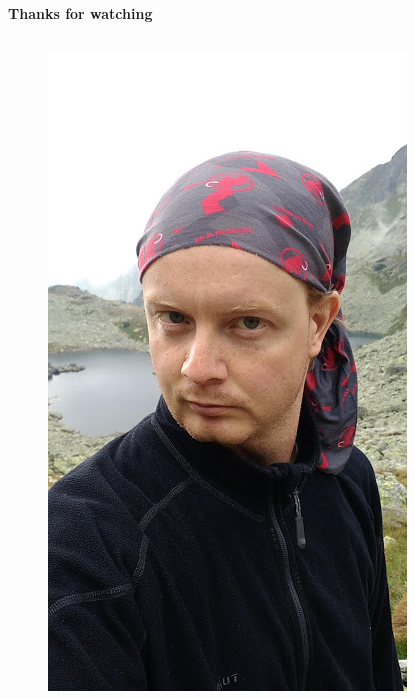 \documentclass[xcolor=dvipsnames]{beamer}
\begin{document}
\begin{frame}{\bf Thanks for watching}


\begin{columns}

\begin{column}{0.3\textwidth}

    \begin{figure}
    \includegraphics[scale=0.25]{../../pictures/me.jpg}
    \end{figure}

\end{column}




\end{columns}
\end{frame}
\end{document}
